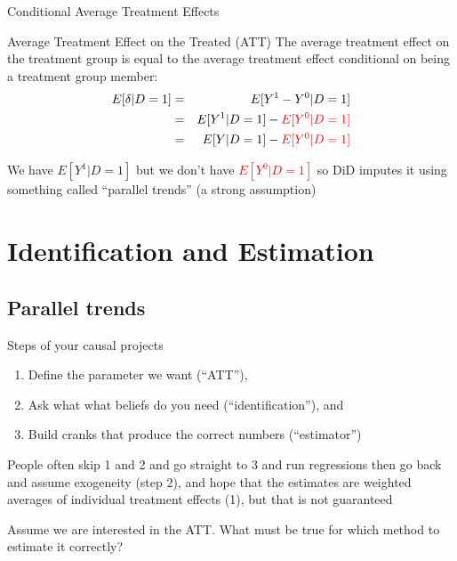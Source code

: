 \documentclass{beamer}
\begin{document}
\begin{frame}{Conditional Average Treatment Effects}	
	\begin{block}{Average Treatment Effect on the Treated (ATT)}
	The average treatment effect on the treatment group is equal to the average treatment effect conditional on being a treatment group member:
		\begin{eqnarray*}
		E[\delta|D=1]&=&E[Y^1-Y^0|D=1] \nonumber \\
		&=&E[Y^1|D=1]-\textcolor{red}{E[Y^0|D=1]} \\
		&=&E[Y|D=1]-\textcolor{red}{E[Y^0|D=1]}
		\end{eqnarray*}
	\end{block}
	
	\bigskip
	
We have $E[Y^1|D=1]$ but we don't have \textcolor{red}{$E[Y^0|D=1]$} so DiD imputes it using something called ``parallel trends'' (a strong assumption)

	
\end{frame}

\section{Identification and Estimation}

\subsection{Parallel trends}


\begin{frame}{Steps of your causal projects}

\begin{enumerate}
\item Define the parameter we want (``ATT''), 
\item Ask what what beliefs do you need (``identification''), and 
\item Build cranks that produce the correct numbers (``estimator'')
\end{enumerate}

\bigskip

People often skip 1 and 2 and go straight to 3 and run regressions then go back and assume exogeneity (step 2), and hope that the estimates are weighted averages of individual treatment effects (1), but that is not guaranteed

\bigskip

Assume we are interested in the ATT.  What must be true for which method to estimate it correctly?

\end{frame}
\end{document}
